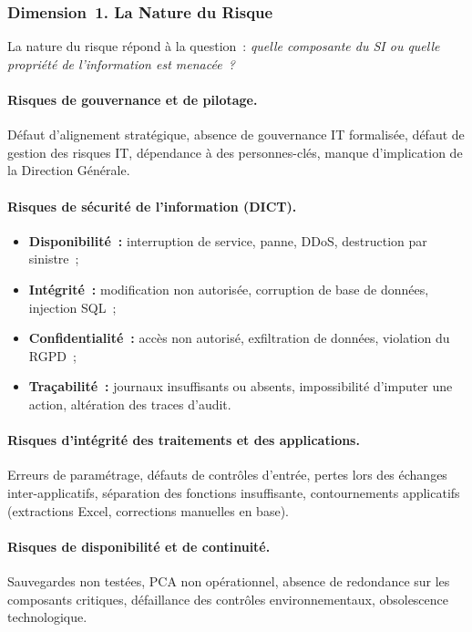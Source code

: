 \subsubsection{Dimension~1. La Nature du Risque}

La nature du risque répond à la question~: \emph{quelle composante du SI ou quelle
propriété de l'information est menacée~?}

\paragraph{Risques de gouvernance et de pilotage.}
Défaut d'alignement stratégique, absence de gouvernance IT formalisée, défaut de
gestion des risques IT, dépendance à des personnes-clés, manque d'implication de la
Direction Générale.

\paragraph{Risques de sécurité de l'information (DICT).}
\begin{itemize}
    \item \textbf{Disponibilité~:} interruption de service, panne, DDoS, destruction
        par sinistre~;
    \item \textbf{Intégrité~:} modification non autorisée, corruption de base de données,
        injection SQL~;
    \item \textbf{Confidentialité~:} accès non autorisé, exfiltration de données,
        violation du RGPD~;
    \item \textbf{Traçabilité~:} journaux insuffisants ou absents, impossibilité
        d'imputer une action, altération des traces d'audit.
\end{itemize}

\paragraph{Risques d'intégrité des traitements et des applications.}
Erreurs de paramétrage, défauts de contrôles d'entrée, pertes lors des échanges
inter-applicatifs, séparation des fonctions insuffisante, contournements applicatifs
(extractions Excel, corrections manuelles en base).

\paragraph{Risques de disponibilité et de continuité.}
Sauvegardes non testées, PCA non opérationnel, absence de redondance sur les composants
critiques, défaillance des contrôles environnementaux, obsolescence technologique.

